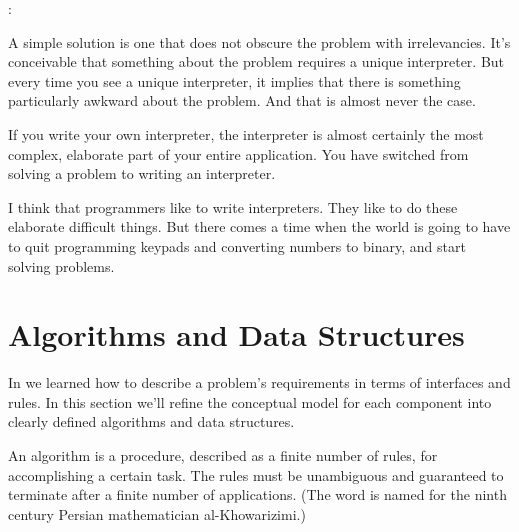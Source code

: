 \begin{interview}
:
\begin{tfquot}
A simple solution is one that does not obscure the problem with irrelevancies.
It's conceivable that something about the problem requires a unique
interpreter. But every time you see a unique interpreter, it implies that
there is something particularly awkward about the problem. And that is
almost never the case.

If you write your own interpreter, the interpreter is almost certainly the
most complex, elaborate part of your entire application. You have switched
from solving a problem to writing an interpreter.

I think that programmers like to write interpreters. They like to do these
elaborate difficult things. But there comes a time when the world is going
to have to quit programming keypads and converting numbers to binary,
and start solving problems.
\end{tfquot}
\end{interview}%
%
%
%
%
%

\section{Algorithms and Data Structures}%
%

In  we learned how to describe a problem's requirements in
terms of interfaces and rules. In this section we'll refine the conceptual
model for each component into clearly defined algorithms and data
structures.

An algorithm is a procedure, described as a finite number of rules,
for accomplishing a certain task. The rules must be unambiguous and
guaranteed to terminate after a finite number of applications. (The word
is named for the ninth century Persian mathematician al-Khowarizimi.)

